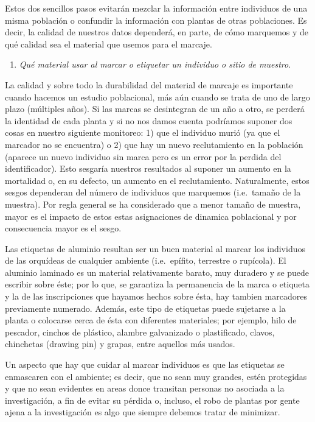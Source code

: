 \documentclass[
]{book}
\providecommand{\tightlist}{%
  \setlength{\itemsep}{0pt}\setlength{\parskip}{0pt}}
\theoremstyle{definition}
\theoremstyle{definition}
\theoremstyle{definition}
\theoremstyle{definition}
\theoremstyle{remark}
\begin{document}
Estos dos sencillos pasos evitarán mezclar la información entre individuos de una misma población o confundir la información con plantas de otras poblaciones.
Es decir, la calidad de nuestros datos dependerá, en parte, de cómo marquemos y de qué calidad sea el material que usemos para el marcaje.

\begin{enumerate}
\def\labelenumi{\alph{enumi})}
\tightlist
\item
  \emph{Qué material usar al marcar o etiquetar un individuo o sitio de muestro}.
\end{enumerate}

La calidad y sobre todo la durabilidad del material de marcaje es importante cuando hacemos un estudio poblacional, más aún cuando se trata de uno de largo plazo (múltiples años).
Si las marcas se desintegran de un año a otro, se perderá la identidad de cada planta y si no nos damos cuenta podríamos suponer dos cosas en nuestro siguiente monitoreo: 1) que el individuo murió (ya que el marcador no se encuentra) o 2) que hay un nuevo reclutamiento en la población (aparece un nuevo individuo sin marca pero es un error por la perdida del identificador).
Esto sesgaría nuestros resultados al suponer un aumento en la mortalidad o, en su defecto, un aumento en el reclutamiento.
Naturalmente, estos sesgos dependeran del número de individuos que marquemos (i.e.~tamaño de la muestra).
Por regla general se ha considerado que a menor tamaño de muestra, mayor es el impacto de estos estas asignaciones de dinamica poblacional y por consecuencia mayor es el sesgo.

Las etiquetas de aluminio resultan ser un buen material al marcar los individuos de las orquídeas de cualquier ambiente (i.e.~epífito, terrestre o rupícola).
El aluminio laminado es un material relativamente barato, muy duradero y se puede escribir sobre éste; por lo que, se garantiza la permanencia de la marca o etiqueta y la de las inscripciones que hayamos hechos sobre ésta, hay tambien marcadores previamente numerado.
Además, este tipo de etiquetas puede sujetarse a la planta o colocarse cerca de ésta con diferentes materiales; por ejemplo, hilo de pescador, cinchos de plástico, alambre galvanizado o plastificado, clavos, chinchetas (drawing pin) y grapas, entre aquellos más usados.

Un aspecto que hay que cuidar al marcar individuos es que las etiquetas se enmascaren con el ambiente; es decir, que no sean muy grandes, estén protegidas y que no sean evidentes en areas donce transitan personas no asociada a la investigación, a fin de evitar su pérdida o, incluso, el robo de plantas por gente ajena a la investigación es algo que siempre debemos tratar de minimizar.
\end{document}
